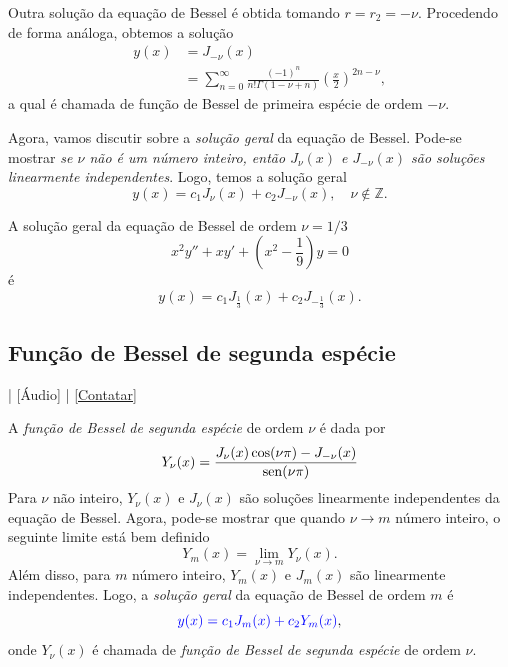  Outra solução da equação de Bessel é obtida tomando $r=r_2=-\nu$. Procedendo de forma análoga, obtemos a solução
  \begin{align}
    y(x) &= J_{-\nu}(x)\\
    &= \sum_{n=0}^\infty \frac{(-1)^n}{n!\Gamma(1-\nu+n)}\left(\frac{x}{2}\right)^{2n-\nu},
  \end{align}
  a qual é chamada de função de Bessel de primeira espécie de ordem $-\nu$.

  Agora, vamos discutir sobre a \emph{solução geral} da equação de Bessel. Pode-se mostrar \emph{se $\nu$ não é um número inteiro, então $J_\nu(x)$ e $J_{-\nu}(x)$ são soluções linearmente independentes}. Logo, temos a solução geral
  \begin{equation}
    y(x) = c_1J_\nu(x) + c_2J_{-\nu}(x),\quad \nu\not\in\mathbb{Z}.
  \end{equation}

  \begin{ex}
    A solução geral da equação de Bessel de ordem $\nu=1/3$
    \begin{equation}
      x^2y'' + xy' + \left(x^2 - \frac{1}{9}\right)y = 0
    \end{equation}
    é
    \begin{equation}
      y(x) = c_1J_{\frac{1}{3}}(x) + c_2J_{-\frac{1}{3}}(x).
    \end{equation}
  \end{ex}

  \subsection{Função de Bessel de segunda espécie}

  \begin{flushright}
    [Vídeo] | [Áudio] | \href{https://phkonzen.github.io/notas/contato.html}{[Contatar]}
  \end{flushright}
  
  A \emph{função de Bessel de segunda espécie} de ordem $\nu$ é dada por
  \begin{equation}
    Y_\nu(x) = \frac{J_\nu(x)\cos(\nu\pi)-J_{-\nu}(x)}{\operatorname{sen}(\nu\pi)}
  \end{equation}
  Para $\nu$ não inteiro, $Y_\nu(x)$ e $J_\nu(x)$ são soluções linearmente independentes da equação de Bessel. Agora, pode-se mostrar que quando $\nu\to m$ número inteiro, o seguinte limite está bem definido
  \begin{equation}
    Y_m(x) = \lim_{\nu\to m} Y_\nu(x).
  \end{equation}
  Além disso, para $m$ número inteiro, $Y_m(x)$ e $J_m(x)$ são linearmente independentes. Logo, a \emph{solução geral} da equação de Bessel de ordem $m$ é
  \begin{equation}
    {\color{blue}y(x) = c_1J_m(x) + c_2Y_m(x)},
  \end{equation}
  onde $Y_\nu(x)$ é chamada de \emph{função de Bessel de segunda espécie} de ordem $\nu$.

